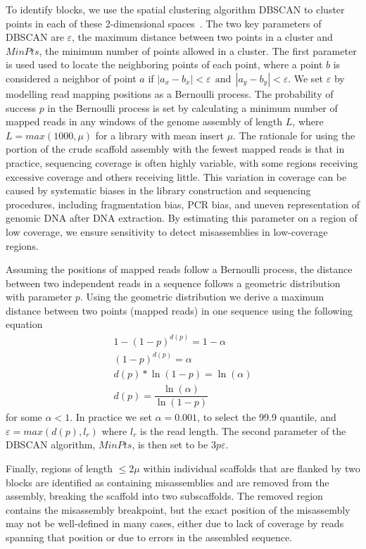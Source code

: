 \documentclass{bioinfo}
\begin{document}
To identify blocks, we use the spatial clustering algorithm DBSCAN 
to cluster points in each of these 2-dimensional spaces~\citep{DBSCAN}. The two key parameters of DBSCAN are $\varepsilon$, the maximum distance between 
two points in a cluster and $MinPts$, the minimum number of points allowed in a cluster. The first parameter is used used to locate 
the neighboring points of each point, where a point $b$ is considered a neighbor of point $a$ if $|a_x - b_x| < \varepsilon 
~~\mbox{and}~~ |a_y - b_y| < \varepsilon$. We set $\varepsilon$ by modelling read mapping positions as a Bernoulli process. 
The probability of success $p$ in the Bernoulli process is set by calculating a minimum number of mapped reads
in any windows of the genome assembly of length $L$, where $L = max(1000,\mu)$ for a library with mean insert $\mu$. 
The rationale for using the portion of the crude scaffold assembly with the fewest mapped reads is that in practice, sequencing
coverage is often highly variable, with some regions receiving excessive coverage and others receiving little. This variation
in coverage can be caused by systematic biases in the library construction and sequencing procedures, including fragmentation bias,
PCR bias, and uneven representation of genomic DNA after DNA extraction. By estimating this parameter on a region of low
coverage, we ensure sensitivity to detect misassemblies in low-coverage regions.

Assuming the positions of mapped reads  
follow a Bernoulli process, the distance between two independent reads in a sequence follows a geometric distribution with parameter $p$.
Using the geometric distribution we derive a maximum distance between two points (mapped reads) in one sequence using the following equation
\begin{eqnarray}
	1 - (1-p)^{d(p)} = 1-\alpha \nonumber \\
	(1-p)^{d(p)} = \alpha  \nonumber \\ 
	d(p)*\ln(1-p) = \ln(\alpha)  \nonumber \\
	d(p) = \dfrac{\ln(\alpha)}{\ln(1-p)} 
\end{eqnarray} 
for some $\alpha < 1$. In practice we set $\alpha = 0.001$, to select the 99.9 quantile, and $\varepsilon = max(d(p),l_r)$ where $l_r$ is the read length.
The second parameter of the DBSCAN algorithm, $MinPts$, is then set to be $3p\varepsilon$.

Finally, regions of length $\le 2\mu$ within individual scaffolds that are flanked by two blocks are identified as containing
misassemblies and are removed from the assembly, breaking the scaffold into two subscaffolds. The removed region contains the 
misassembly breakpoint, but the exact position of the misassembly may not be well-defined in many cases, either due to lack of
coverage by reads spanning that position or due to errors in the assembled sequence.
\end{document}

